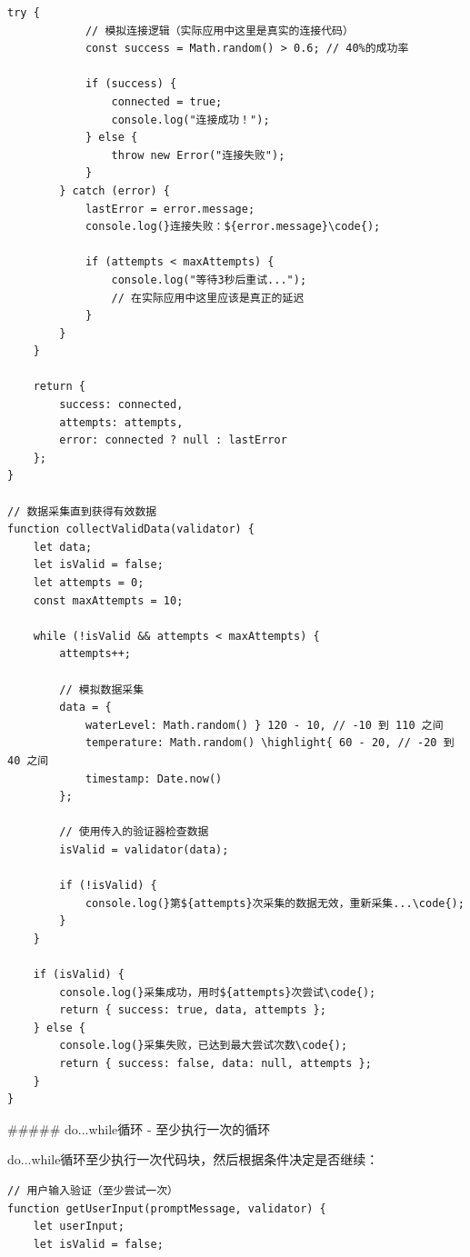 {\begin{lstlisting}[style=javascript]
        try {
            // 模拟连接逻辑（实际应用中这里是真实的连接代码）
            const success = Math.random() > 0.6; // 40%的成功率
            
            if (success) {
                connected = true;
                console.log("连接成功！");
            } else {
                throw new Error("连接失败");
            }
        } catch (error) {
            lastError = error.message;
            console.log(}连接失败：${error.message}\code{);
            
            if (attempts < maxAttempts) {
                console.log("等待3秒后重试...");
                // 在实际应用中这里应该是真正的延迟
            }
        }
    }
    
    return {
        success: connected,
        attempts: attempts,
        error: connected ? null : lastError
    };
}

// 数据采集直到获得有效数据
function collectValidData(validator) {
    let data;
    let isValid = false;
    let attempts = 0;
    const maxAttempts = 10;
    
    while (!isValid && attempts < maxAttempts) {
        attempts++;
        
        // 模拟数据采集
        data = {
            waterLevel: Math.random() } 120 - 10, // -10 到 110 之间
            temperature: Math.random() \highlight{ 60 - 20, // -20 到 40 之间
            timestamp: Date.now()
        };
        
        // 使用传入的验证器检查数据
        isValid = validator(data);
        
        if (!isValid) {
            console.log(}第${attempts}次采集的数据无效，重新采集...\code{);
        }
    }
    
    if (isValid) {
        console.log(}采集成功，用时${attempts}次尝试\code{);
        return { success: true, data, attempts };
    } else {
        console.log(}采集失败，已达到最大尝试次数\code{);
        return { success: false, data: null, attempts };
    }
}
\end{lstlisting}

##### do...while循环 - 至少执行一次的循环

do...while循环至少执行一次代码块，然后根据条件决定是否继续：

\begin{lstlisting}[style=javascript]
// 用户输入验证（至少尝试一次）
function getUserInput(promptMessage, validator) {
    let userInput;
    let isValid = false;
    

\end{lstlisting}}
